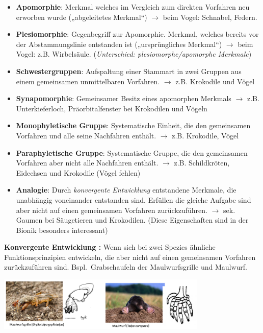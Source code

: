 \begin{center}
	\begin{itemize}
		\item \textbf{Apomorphie}: Merkmal welches im Vergleich zum direkten Vorfahren neu erworben wurde („abgeleitetes Merkmal“) $\rightarrow$ beim Vogel: Schnabel, Federn.
		\item \textbf{Plesiomorphie}: Gegenbegriff zur Apomorphie. Merkmal, welches bereits vor der Abstammungslinie entstanden ist („ursprüngliches Merkmal“) $\rightarrow$ beim Vogel: z.B. Wirbelsäule. (\dangersign \textit{Unterschied: plesiomorphe/apomorphe Merkmale})
		\item \textbf{Schwestergruppen}: Aufspaltung einer Stammart in zwei Gruppen aus einem gemeinsamen unmittelbaren Vorfahren. $\rightarrow$ z.B. Krokodile und Vögel
		\item \textbf{Synapomorphie}: Gemeinsamer Besitz eines apomorphen Merkmals $\rightarrow$ z.B. Unterkieferloch, Präorbitalfenster bei Krokodilen und Vögeln
		\item \textbf{Monophyletische Gruppe}: Systematische Einheit, die den gemeinsamen Vorfahren und alle seine Nachfahren enthält. $\rightarrow$ z.B. Krokodile, Vögel
		\item \textbf{Paraphyletische Gruppe}: Systematische Gruppe, die den gemeinsamen Vorfahren aber nicht alle Nachfahren enthält. $\rightarrow$ z.B. Schildkröten, Eidechsen und Krokodile (Vögel fehlen)
		\item \textbf{Analogie}: Durch \textit{konvergente Entwicklung} entstandene Merkmale, die unabhängig voneinander entstanden sind. Erfüllen die gleiche Aufgabe sind aber nicht auf einen gemeinsamen Vorfahren zurückzuführen. $\rightarrow$ sek. Gaumen bei Säugetieren und Krokodilen. (Diese Eigenschaften sind in der Bionik besonders interessant)
	\end{itemize}
\end{center}
\textbf{Konvergente Entwicklung \dangersign:} Wenn sich bei zwei Spezies ähnliche Funktionsprinzipien entwickeln, die aber nicht auf einen gemeinsamen Vorfahren zurückzuführen sind. Bspl.\ Grabschaufeln der Maulwurfsgrille und Maulwurf.

\begin{center}
    \includegraphics[width=10cm]{lec1/figures/maulwurf.png}    
\end{center}

